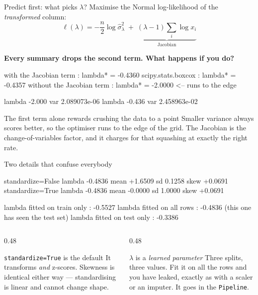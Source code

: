 \documentclass[aspectratio=169]{beamer}
\begin{document}
\begin{frame}[fragile,shrink=6]{Predict first: what picks $\lambda$?}
Maximise the Normal log-likelihood of the \emph{transformed} column:
\[
  \ell(\lambda) = -\frac{n}{2}\log\hat\sigma^2_\lambda
  \;+\; \underbrace{(\lambda-1)\sum_i \log x_i}_{\text{Jacobian}}
\]
\begin{center}
  \textbf{Every summary drops the second term. What happens if you do?}
\end{center}
\begin{outblk}
with the Jacobian term    : lambda* = -0.4360
scipy.stats.boxcox        : lambda* = -0.4357
without the Jacobian term : lambda* = -2.0000  <-- runs to the edge

   lambda -2.000   var 2.089073e-06
   lambda -0.436   var 2.458963e-02
\end{outblk}
\begin{alertblock}{The first term alone rewards crushing the data to a point}
  \footnotesize Smaller variance always scores better, so the optimiser runs to
  the edge of the grid. The Jacobian is the change-of-variables factor, and it
  charges for that squashing at exactly the right rate.
\end{alertblock}
\end{frame}

\begin{frame}[fragile,shrink=6]{Two details that confuse everybody}
\begin{outblk}
standardize=False  lambda -0.4836   mean    +1.6509   sd   0.1258   skew +0.0691
standardize=True   lambda -0.4836   mean    -0.0000   sd   1.0000   skew +0.0691

lambda fitted on train only : -0.5527
lambda fitted on all rows   : -0.4836   (this one has seen the test set)
lambda fitted on test only  : -0.3386
\end{outblk}
\vspace{0.2em}
\begin{columns}[T]
  \begin{column}{0.48\textwidth}
    \begin{block}{\texttt{standardize=True} is the default}
      \small It transforms \emph{and} z-scores. Skewness is identical either
      way --- standardising is linear and cannot change shape.
    \end{block}
  \end{column}
  \begin{column}{0.48\textwidth}
    \begin{alertblock}{$\lambda$ is a \emph{learned parameter}}
      \small Three splits, three values. Fit it on all the rows and you have
      leaked, exactly as with a scaler or an imputer. It goes in the
      \texttt{Pipeline}.
    \end{alertblock}
  \end{column}
\end{columns}
\end{frame}
\end{document}
